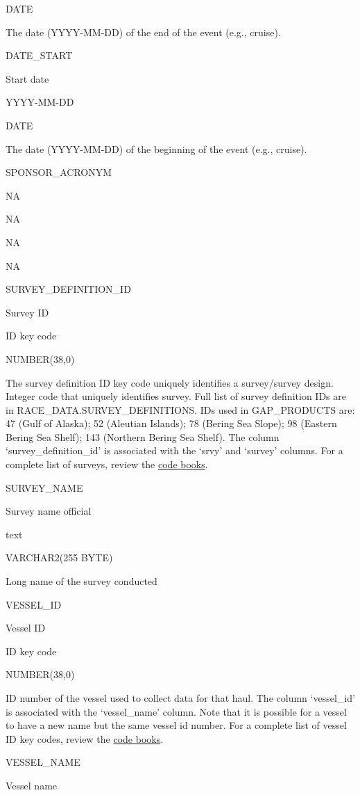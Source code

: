 \documentclass[
  letterpaper,
  oneside,
  open=any]{scrbook}
\begin{document}
DATE

The date (YYYY-MM-DD) of the end of the event (e.g., cruise).

DATE\_START

Start date

YYYY-MM-DD

DATE

The date (YYYY-MM-DD) of the beginning of the event (e.g., cruise).

SPONSOR\_ACRONYM

NA

NA

NA

NA

SURVEY\_DEFINITION\_ID

Survey ID

ID key code

NUMBER(38,0)

The survey definition ID key code uniquely identifies a survey/survey
design. Integer code that uniquely identifies survey. Full list of
survey definition IDs are in RACE\_DATA.SURVEY\_DEFINITIONS. IDs used in
GAP\_PRODUCTS are: 47 (Gulf of Alaska); 52 (Aleutian Islands); 78
(Bering Sea Slope); 98 (Eastern Bering Sea Shelf); 143 (Northern Bering
Sea Shelf). The column `survey\_definition\_id' is associated with the
`srvy' and `survey' columns. For a complete list of surveys, review the
\href{https://www.fisheries.noaa.gov/resource/document/groundfish-survey-species-code-manual-and-data-codes-manual}{code
books}.

SURVEY\_NAME

Survey name official

text

VARCHAR2(255 BYTE)

Long name of the survey conducted

VESSEL\_ID

Vessel ID

ID key code

NUMBER(38,0)

ID number of the vessel used to collect data for that haul. The column
`vessel\_id' is associated with the `vessel\_name' column. Note that it
is possible for a vessel to have a new name but the same vessel id
number. For a complete list of vessel ID key codes, review the
\href{https://www.fisheries.noaa.gov/resource/document/groundfish-survey-species-code-manual-and-data-codes-manual}{code
books}.

VESSEL\_NAME

Vessel name
\end{document}

